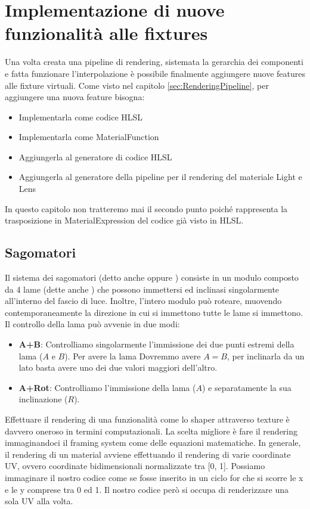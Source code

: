 \documentclass[main.tex]{subfiles}
\begin{document}
\sloppy


\vspace{1.0cm}

\section{Implementazione di nuove funzionalità alle fixtures}\label{sec:NewFeatures}
Una volta creata una pipeline di rendering, sistemata la gerarchia dei componenti e fatta funzionare l'interpolazione è possibile finalmente aggiungere nuove features alle fixture virtuali. Come visto nel capitolo \ref{sec:RenderingPipeline}, per aggiungere una nuova feature bisogna:
\begin{itemize}
	\item Implementarla come codice HLSL
	\item Implementarla come MaterialFunction
	\item Aggiungerla al generatore di codice HLSL
	\item Aggiungerla al generatore della pipeline per il rendering del materiale Light e Lens
\end{itemize}
In questo capitolo non tratteremo mai il secondo punto poiché rappresenta la trasposizione in MaterialExpression del codice già visto in HLSL.

\subsection{Sagomatori}\label{subsec:5_shaper}
Il sistema dei sagomatori (detto anche  oppure ) consiste in un modulo composto da 4 lame (dette anche ) che possono immettersi ed inclinasi singolarmente all'interno del fascio di luce. Inoltre, l'intero modulo può roteare, muovendo contemporaneamente la direzione in cui si immettono tutte le lame si immettono.
Il controllo della lama può avvenie in due modi:
\begin{itemize}
	\item \textbf{A+B}: Controlliamo singolarmente l'immissione dei due punti estremi della lama ($A$ e $B$). Per avere la lama  Dovremmo avere $A = B$, per inclinarla da un lato basta avere uno dei due valori maggiori dell'altro.
	\item \textbf{A+Rot}: Controlliamo l'immissione della lama ($A$) e separatamente la sua inclinazione ($R$).
\end{itemize}
Effettuare il rendering di una funzionalità come lo shaper attraverso texture è davvero oneroso in termini computazionali. La scelta migliore è fare il rendering immaginandoci il framing system come delle equazioni matematiche. In generale, il rendering di un material avviene effettuando il rendering di varie coordinate UV, ovvero coordinate bidimensionali normalizzate tra [0, 1]. Possiamo immaginare il nostro codice come se fosse inserito in un ciclo for che si scorre  le x e le y comprese tra 0 ed 1. Il nostro codice però si occupa di renderizzare una sola UV alla volta. 
\end{document}
